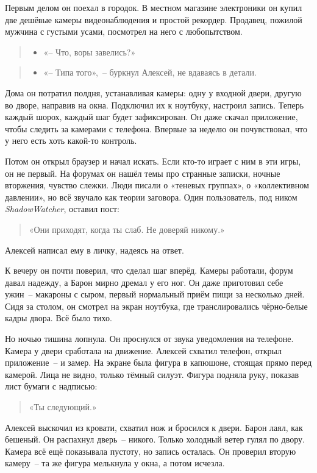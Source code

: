 \documentclass[12pt,a4paper]{book}
\newenvironment{dialogue}{\begin{quote}\itshape\begin{itemize}\item[]}{\end{itemize}\end{quote}}
\begin{document}
Первым делом он поехал в городок. В местном магазине электроники он купил две дешёвые камеры видеонаблюдения и простой рекордер. Продавец, пожилой мужчина с густыми усами, посмотрел на него с любопытством.

\begin{dialogue}
«-- Что, воры завелись?»
\end{dialogue}

\begin{dialogue}
«-- Типа того»,~-- буркнул Алексей, не вдаваясь в детали.
\end{dialogue}

Дома он потратил полдня, устанавливая камеры: одну у входной двери, другую во дворе, направив на окна. Подключил их к ноутбуку, настроил запись. Теперь каждый шорох, каждый шаг будет зафиксирован. Он даже скачал приложение, чтобы следить за камерами с телефона. Впервые за неделю он почувствовал, что у него есть хоть какой-то контроль.

Потом он открыл браузер и начал искать. Если кто-то играет с ним в эти игры, он не первый. На форумах он нашёл темы про странные записки, ночные вторжения, чувство слежки. Люди писали о «теневых группах», о «коллективном давлении», но всё звучало как теории заговора. Один пользователь, под ником \textit{ShadowWatcher}, оставил пост:

\begin{quote}
«Они приходят, когда ты слаб. Не доверяй никому.»
\end{quote}

Алексей написал ему в личку, надеясь на ответ.

К вечеру он почти поверил, что сделал шаг вперёд. Камеры работали, форум давал надежду, а Барон мирно дремал у его ног. Он даже приготовил себе ужин~-- макароны с сыром, первый нормальный приём пищи за несколько дней. Сидя за столом, он смотрел на экран ноутбука, где транслировались чёрно-белые кадры двора. Всё было тихо.

Но ночью тишина лопнула. Он проснулся от звука уведомления на телефоне. Камера у двери сработала на движение. Алексей схватил телефон, открыл приложение~-- и замер. На экране была фигура в капюшоне, стоящая прямо перед камерой. Лица не видно, только тёмный силуэт. Фигура подняла руку, показав лист бумаги с надписью:

\begin{quote}
«Ты следующий.»
\end{quote}

Алексей выскочил из кровати, схватил нож и бросился к двери. Барон лаял, как бешеный. Он распахнул дверь~-- никого. Только холодный ветер гулял по двору. Камера всё ещё показывала пустоту, но запись осталась. Он проверил вторую камеру~-- та же фигура мелькнула у окна, а потом исчезла.
\end{document}
